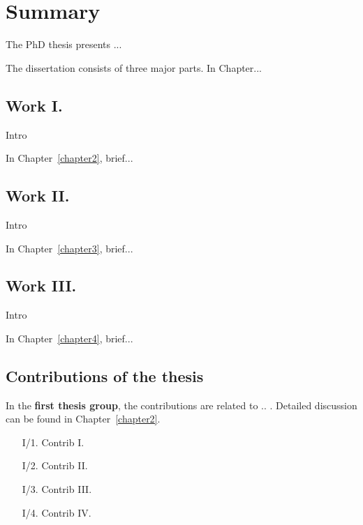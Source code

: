 \chapter*{Summary}


\ifpdf
    \graphicspath{{Chapter6/Figs/Raster/}{Chapter6/Figs/PDF/}{Chapter6/Figs/}}
\else
    \graphicspath{{Chapter6/Figs/Vector/}{Chapter6/Figs/}}
\fi


The PhD thesis presents ... 

The dissertation consists of three major parts. In Chapter...

\section*{Work I.}

Intro

In Chapter~\ref{chapter2}, brief...

\section*{Work II.}

Intro

In Chapter~\ref{chapter3}, brief...

\newpage
\section*{Work III.}

Intro

In Chapter~\ref{chapter4}, brief...

\vfill
\pagebreak

\section*{Contributions of the thesis}

In the \textbf{first thesis group}, the contributions are related to .. . Detailed discussion can be found in Chapter~\ref{chapter2}.

\begin{enumerate}[wide = 0pt, widest = {I/4.}, leftmargin =*]
	\item[I/1.] Contrib I.
	
	\item[I/2.] Contrib II.
	
	\item[I/3.] Contrib III.
	
	\item[I/4.] Contrib IV.
\end{enumerate}

